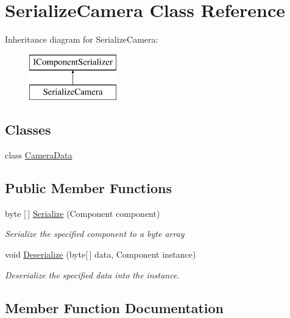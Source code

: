 \hypertarget{class_serialize_camera}{}\section{Serialize\+Camera Class Reference}
\label{class_serialize_camera}
Inheritance diagram for Serialize\+Camera\+:\begin{figure}[H]
\begin{center}
\leavevmode
\includegraphics[height=2.000000cm]{class_serialize_camera}
\end{center}
\end{figure}
\subsection*{Classes}
\begin{DoxyCompactItemize}
\item 
class \hyperlink{class_serialize_camera_1_1_camera_data}{Camera\+Data}
\end{DoxyCompactItemize}
\subsection*{Public Member Functions}
\begin{DoxyCompactItemize}
\item 
byte \mbox{[}$\,$\mbox{]} \hyperlink{class_serialize_camera_a003d716552672a6f3994a768aded2235}{Serialize} (Component component)
\begin{DoxyCompactList}\small\item\em Serialize the specified component to a byte array \end{DoxyCompactList}\item 
void \hyperlink{class_serialize_camera_af71e86c5582df1d9eb1d4e652fe00f83}{Deserialize} (byte\mbox{[}$\,$\mbox{]} data, Component instance)
\begin{DoxyCompactList}\small\item\em Deserialize the specified data into the instance. \end{DoxyCompactList}\end{DoxyCompactItemize}


\subsection{Member Function Documentation}
\mbox{\label{class_serialize_camera_af71e86c5582df1d9eb1d4e652fe00f83}} 
